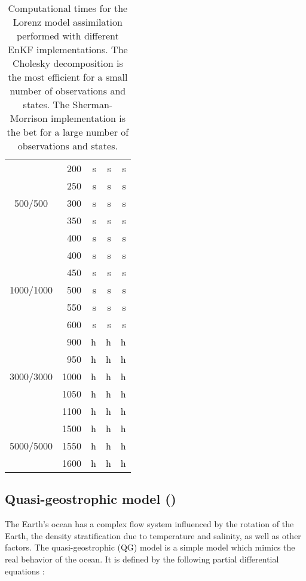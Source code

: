 \documentclass[12pt]{article}
\begin{document}
\begin{table}[H]
\centering
{
\begin{tabular}{|c|r|r|r|r|} \hline
 &  &  &  &   \\ \hline
\multirow{5}{*}{500/500} & 200 &  s &  s &  s \\ 
&   250 &  s &  s &  s \\ 
&   300 &  s &  s &  s \\ 
&   350 &  s &  s &  s \\ 
&   400 &  s &  s &  s \\ \hline
\multirow{5}{*}{1000/1000} & 400 &  s &  s &  s \\ 
&   450 &  s &  s &  s \\ 
&   500 &  s &  s &   s \\ 
&   550 &  s &  s &   s \\ 
&   600 &  s &  s &  s \\ \hline
\multirow{5}{*}{3000/3000} & 900 &  h &  h &  h  \\ 
&   950 &  h &  h &  h \\ 
&   1000 &  h &  h &  h  \\ 
&   1050 &  h &  h &  h  \\ 
&   1100 &  h &  h &  h \\ \hline
\multirow{3}{*}{5000/5000} & 1500 &  h &  h &  h  \\ 
&   1550 &  h &  h &  h\\ 
&   1600 &  h &  h &  h  \\ \hline
\end{tabular}
}
\caption{Computational times for the Lorenz model assimilation performed with different EnKF implementations. 
The Cholesky decomposition is the most efficient for a small number of observations and states. The
Sherman-Morrison implementation is the bet for a large number of observations and states. 
}
\label{Tab:Lorenz-Results-TIME}
\end{table}

\subsection{Quasi-geostrophic model ()}


The Earth's ocean has a complex flow system influenced by the rotation of the Earth, the density stratification due to temperature and salinity, as well as other factors. The quasi-geostrophic (QG) model is a simple model which mimics the real behavior of the ocean. 
It is defined by the following partial differential equations \cite{Carton94}:
\end{document}
